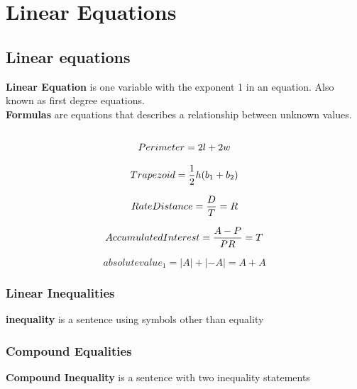 \chapter{Linear Equations}

\section{Linear equations}
\textbf{Linear Equation} is one variable with the exponent 1 in an equation. Also known as first degree equations.\\
\textbf{Formulas} are equations that describes a relationship between unknown values.\\
\\
\begin{equation}\label{perimeter} 
	Perimeter = 2l + 2w\\
\end{equation}

\begin{equation}\label{trapezoid} 
	Trapezoid = \frac{1}{2}h(b_1 + b_2)\\
\end{equation}

\begin{equation}\label{ratedistance} 
	RateDistance = \frac{D}{T} = R\\
\end{equation}

\begin{equation}\label{accumulatedinterest} 
	Accumulated Interest = \frac{A - P}{PR} = T\\
\end{equation}

\begin{equation}\label{absolutevalue} 
	absolutevalue_1 = |A| + |-A| = A + A
\end{equation}

\subsection{Linear Inequalities}
\textbf{inequality} is a sentence using symbols other than equality
\\
\subsection{Compound Equalities}
\textbf{Compound Inequality} is a sentence with two inequality statements


